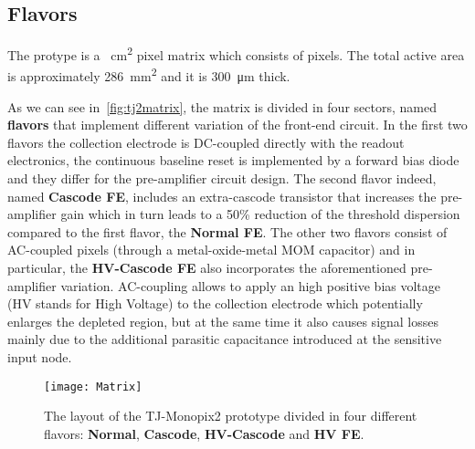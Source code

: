 
\subsection{Flavors} \label{sec:flavors}

The protype is a ~\unit{cm^{2}} pixel matrix which consists of  pixels. The total active area is approximately \SI{286}{mm^{2}} and it is \SI{300}{\micro m} thick.


\begin{comment}
\begin{figure}[h!]
\centering
\texttt{[image: Tj1pix\_cov]}
\caption{Detection efficiency map of a TJ-Monopix1 chip with \SI{25}{\micro m} p-epitaxial layer that has been irradiated to \SI{e15}{n_{\textit{eq}}/cm^{2}} NIEL.}
\label{fig:tj1pix_cov}
\end{figure}
\end{comment}


As we can see in~\autoref{fig:tj2matrix}, the matrix is divided in four sectors, named \textbf{flavors} that implement different variation of the front-end circuit. In the first two flavors the collection electrode is DC-coupled directly with the readout electronics,  the continuous baseline reset is implemented by a forward bias diode and they differ for the pre-amplifier circuit design. The second flavor indeed, named \textbf{Cascode FE}, includes an extra-cascode transistor that increases the pre-amplifier gain which in turn leads to a 50\% reduction of the threshold dispersion compared to the first flavor, the \textbf{Normal FE}. The other two flavors consist of AC-coupled pixels (through a metal-oxide-metal MOM capacitor) and in particular, the \textbf{HV-Cascode FE} also incorporates the aforementioned pre-amplifier variation. AC-coupling allows to apply an high positive bias voltage (HV stands for High Voltage) to the collection electrode which potentially enlarges the depleted region, but at the same time it also causes signal losses mainly due to the additional parasitic capacitance introduced at the sensitive input node.\\


\begin{figure}[h!]
\centering
\texttt{[image: Matrix]}
\caption{The layout of the TJ-Monopix2 prototype divided in four different flavors: \textbf{Normal}, \textbf{Cascode}, \textbf{HV-Cascode} and \textbf{HV FE}.}
\label{fig:tj2matrix}
\end{figure}


